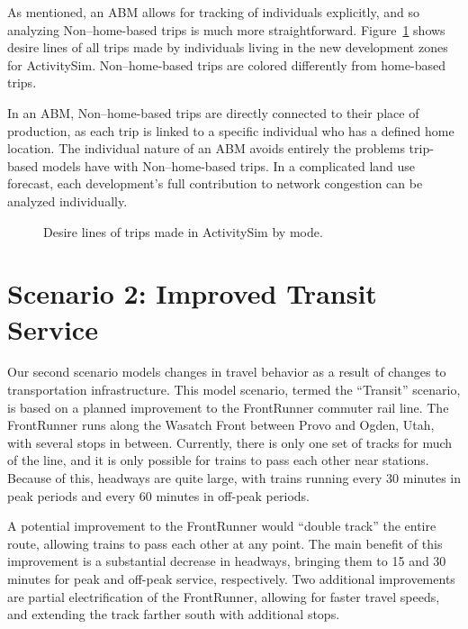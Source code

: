\documentclass[fancy, oneside, mastersfancy, ms]{byuthesis}
\begin{document}
As mentioned, an ABM allows for tracking of individuals explicitly, and
so analyzing Non--home-based trips is much more straightforward.
Figure~\ref{fig-lu-desire-asim} shows desire lines of all trips made by
individuals living in the new development zones for ActivitySim.
Non--home-based trips are colored differently from home-based trips.

In an ABM, Non--home-based trips are directly connected to their place
of production, as each trip is linked to a specific individual who has a
defined home location. The individual nature of an ABM avoids entirely
the problems trip-based models have with Non--home-based trips. In a
complicated land use forecast, each development's full contribution to
network congestion can be analyzed individually.

\begin{figure}


\caption{\label{fig-lu-desire-asim}Desire lines of trips made in
ActivitySim by mode.}

\end{figure}%


\chapter{Scenario 2: Improved Transit Service}\label{sec-transit}

Our second scenario models changes in travel behavior as a result of
changes to transportation infrastructure. This model scenario, termed
the ``Transit'' scenario, is based on a planned improvement to the
FrontRunner commuter rail line. The FrontRunner runs along the Wasatch
Front between Provo and Ogden, Utah, with several stops in between.
Currently, there is only one set of tracks for much of the line, and it
is only possible for trains to pass each other near stations. Because of
this, headways are quite large, with trains running every 30 minutes in
peak periods and every 60 minutes in off-peak periods.

A potential improvement to the FrontRunner would ``double track'' the
entire route, allowing trains to pass each other at any point. The main
benefit of this improvement is a substantial decrease in headways,
bringing them to 15 and 30 minutes for peak and off-peak service,
respectively. Two additional improvements are partial electrification of
the FrontRunner, allowing for faster travel speeds, and extending the
track farther south with additional stops.
\end{document}
